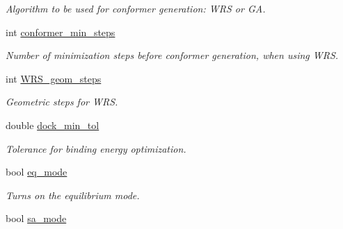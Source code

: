 \begin{DoxyCompactItemize}
\begin{DoxyCompactList}\small\item\em Algorithm to be used for conformer generation: WRS or GA. \item\end{DoxyCompactList}\item 
\hypertarget{classPARSER_a4d4c3e04bfc07678d2707871dd186742}{
int \hyperlink{classPARSER_a4d4c3e04bfc07678d2707871dd186742}{conformer\_\-min\_\-steps}}
\label{classPARSER_a4d4c3e04bfc07678d2707871dd186742}

\begin{DoxyCompactList}\small\item\em Number of minimization steps before conformer generation, when using WRS. \item\end{DoxyCompactList}\item 
\hypertarget{classPARSER_a9ba3ef77b00a37f15df8bb43897af34c}{
int \hyperlink{classPARSER_a9ba3ef77b00a37f15df8bb43897af34c}{WRS\_\-geom\_\-steps}}
\label{classPARSER_a9ba3ef77b00a37f15df8bb43897af34c}

\begin{DoxyCompactList}\small\item\em Geometric steps for WRS. \item\end{DoxyCompactList}\item 
\hypertarget{classPARSER_afd166d4ee2a41375991d577365c7b574}{
double \hyperlink{classPARSER_afd166d4ee2a41375991d577365c7b574}{dock\_\-min\_\-tol}}
\label{classPARSER_afd166d4ee2a41375991d577365c7b574}

\begin{DoxyCompactList}\small\item\em Tolerance for binding energy optimization. \item\end{DoxyCompactList}\item 
\hypertarget{classPARSER_afb215f7ad9321d0f29566c3bc303f8c3}{
bool \hyperlink{classPARSER_afb215f7ad9321d0f29566c3bc303f8c3}{eq\_\-mode}}
\label{classPARSER_afb215f7ad9321d0f29566c3bc303f8c3}

\begin{DoxyCompactList}\small\item\em Turns on the equilibrium mode. \item\end{DoxyCompactList}\item 
\hypertarget{classPARSER_a2955359c2f95e0ab8e01c908460da966}{
bool \hyperlink{classPARSER_a2955359c2f95e0ab8e01c908460da966}{sa\_\-mode}}
\label{classPARSER_a2955359c2f95e0ab8e01c908460da966}


\end{DoxyCompactItemize}

